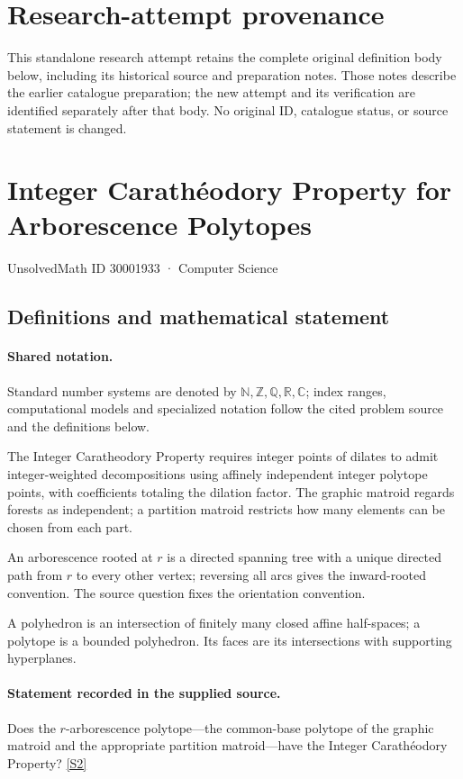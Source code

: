 \documentclass[11pt]{article}
\begin{document}
\section*{Research-attempt provenance}
This standalone research attempt retains the complete original definition body below,
including its historical source and preparation notes. Those notes describe the
earlier catalogue preparation; the new attempt and its verification are identified
separately after that body. No original ID, catalogue status, or source statement is changed.

\section{Integer Carathéodory Property for Arborescence Polytopes}\label{30001933}
{\small UnsolvedMath ID 30001933 · Computer Science}
\subsection{Definitions and mathematical statement}

\paragraph{Shared notation.}Standard number systems are denoted by $\mathbb N,\mathbb Z,\mathbb Q,\mathbb R,\mathbb C$; index ranges, computational models and specialized notation follow the cited problem source and the definitions below.


The Integer Caratheodory Property requires integer points of dilates to admit integer-weighted decompositions using affinely independent integer polytope points, with coefficients totaling the dilation factor. The graphic matroid regards forests as independent; a partition matroid restricts how many elements can be chosen from each part.

An arborescence rooted at $r$ is a directed spanning tree with a unique directed path from $r$ to every other vertex; reversing all arcs gives the inward-rooted convention. The source question fixes the orientation convention.

A polyhedron is an intersection of finitely many closed affine half-spaces; a polytope is a bounded polyhedron. Its faces are its intersections with supporting hyperplanes.
\paragraph{Statement recorded in the supplied source.}
Does the $r$-arborescence polytope—the common-base polytope of the graphic matroid and the appropriate partition matroid—have the Integer Carathéodory Property? \href{https://doi.org/10.4171/owr/2011/53}{[S2]}
\end{document}
